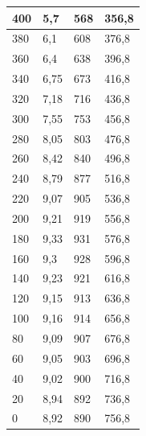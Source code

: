 \documentclass[a4paper,12pt]{article} %
\begin{document}
\begin{table}[h!]
\begin{tabular}{|ll|l|l|}
\multicolumn{1}{|l|}{400}        & 5,7         & 568             & 356,8             \\ \hline
\multicolumn{1}{|l|}{380}        & 6,1         & 608             & 376,8             \\ \hline
\multicolumn{1}{|l|}{360}        & 6,4         & 638             & 396,8             \\ \hline
\multicolumn{1}{|l|}{340}        & 6,75        & 673             & 416,8             \\ \hline
\multicolumn{1}{|l|}{320}        & 7,18        & 716             & 436,8             \\ \hline
\multicolumn{1}{|l|}{300}        & 7,55        & 753             & 456,8             \\ \hline
\multicolumn{1}{|l|}{280}        & 8,05        & 803             & 476,8             \\ \hline
\multicolumn{1}{|l|}{260}        & 8,42        & 840             & 496,8             \\ \hline
\multicolumn{1}{|l|}{240}        & 8,79        & 877             & 516,8             \\ \hline
\multicolumn{1}{|l|}{220}        & 9,07        & 905             & 536,8             \\ \hline
\multicolumn{1}{|l|}{200}        & 9,21        & 919             & 556,8             \\ \hline
\multicolumn{1}{|l|}{180}        & 9,33        & 931             & 576,8             \\ \hline
\multicolumn{1}{|l|}{160}        & 9,3         & 928             & 596,8             \\ \hline
\multicolumn{1}{|l|}{140}        & 9,23        & 921             & 616,8             \\ \hline
\multicolumn{1}{|l|}{120}        & 9,15        & 913             & 636,8             \\ \hline
\multicolumn{1}{|l|}{100}        & 9,16        & 914             & 656,8             \\ \hline
\multicolumn{1}{|l|}{80}         & 9,09        & 907             & 676,8             \\ \hline
\multicolumn{1}{|l|}{60}         & 9,05        & 903             & 696,8             \\ \hline
\multicolumn{1}{|l|}{40}         & 9,02        & 900             & 716,8             \\ \hline
\multicolumn{1}{|l|}{20}         & 8,94        & 892             & 736,8             \\ \hline
\multicolumn{1}{|l|}{0}          & 8,92        & 890             & 756,8             \\ \hline
\end{tabular}
\end{table}
\end{document}
